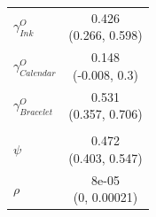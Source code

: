 \begin{tabular}[t]{lc}
\hspace{1em}\(\gamma^O_{Ink}\) & \makecell[c]{0.426\\(0.266, 0.598)}\\
\hspace{1em}\(\gamma^O_{Calendar}\) & \makecell[c]{0.148\\(-0.008, 0.3)}\\
\hspace{1em}\(\gamma^O_{Bracelet}\) & \makecell[c]{0.531\\(0.357, 0.706)}\\
\addlinespace[0.3em]
\multicolumn{2}{l}{\textbf{Relative valuation}}\\
\hspace{1em}\(\psi\) & \makecell[c]{0.472\\(0.403, 0.547)}\\
\hspace{1em}\(\rho\) & \makecell[c]{8e-05\\(0, 0.00021)}\\
\bottomrule
\end{tabular}
